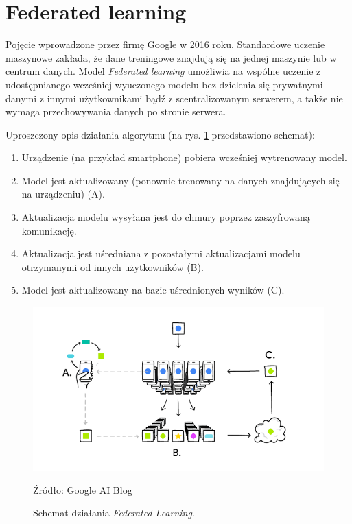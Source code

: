 \section{Federated learning}
\label{section:federatedLearning}

Pojęcie wprowadzone przez firmę Google w 2016 roku. Standardowe uczenie maszynowe zakłada, że dane treningowe znajdują się na jednej maszynie lub w centrum danych. Model \textit{Federated learning} umożliwia na wspólne uczenie z udostępnianego wcześniej wyuczonego modelu bez dzielenia się prywatnymi danymi z innymi użytkownikami bądź z scentralizowanym serwerem, a także nie wymaga przechowywania danych po stronie serwera.

Uproszczony opis działania algorytmu (na rys. \ref{fig:fl} przedstawiono schemat):
\begin{enumerate}
    \item Urządzenie (na przykład smartphone) pobiera wcześniej wytrenowany model.
    \item Model jest aktualizowany (ponownie trenowany na danych znajdujących się na urządzeniu) (A).
    \item Aktualizacja modelu wysyłana jest do chmury poprzez zaszyfrowaną komunikację.
    \item Aktualizacja jest uśredniana z pozostałymi aktualizacjami modelu otrzymanymi od innych użytkowników (B).
    \item Model jest aktualizowany na bazie uśrednionych wyników (C).
\end{enumerate}

\begin{figure}
    \centering
    \includegraphics[scale=0.6]{images/fl.png}
    \caption{Schemat działania \textit{Federated Learning}.}    Źródło: Google AI Blog \cite{fedderatedLearning}
    \label{fig:fl}
\end{figure}


